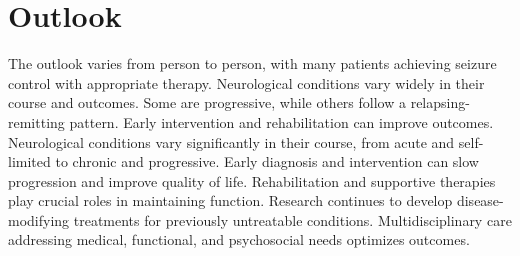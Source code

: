 \section{Outlook}
The outlook varies from person to person, with many patients achieving seizure control with appropriate therapy. Neurological conditions vary widely in their course and outcomes. Some are progressive, while others follow a relapsing-remitting pattern. Early intervention and rehabilitation can improve outcomes. Neurological conditions vary significantly in their course, from acute and self-limited to chronic and progressive. Early diagnosis and intervention can slow progression and improve quality of life. Rehabilitation and supportive therapies play crucial roles in maintaining function. Research continues to develop disease-modifying treatments for previously untreatable conditions. Multidisciplinary care addressing medical, functional, and psychosocial needs optimizes outcomes.
